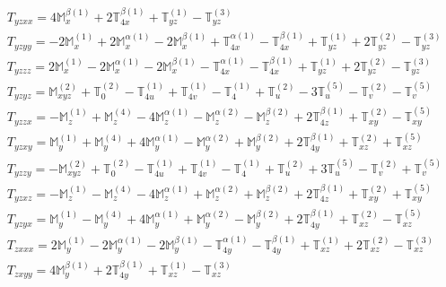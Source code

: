 \documentclass[fleqn,8pt,landscape]{jsarticle}
\begin{document}
\begin{align*}
& T_{yzxx} = 4 \mathbb{M}_{x}^{\beta(1)} + 2 \mathbb{T}_{4x}^{\beta(1)} + \mathbb{T}_{yz}^{(1)} - \mathbb{T}_{yz}^{(3)} \\
& T_{yzyy} = - 2 \mathbb{M}_{x}^{(1)} + 2 \mathbb{M}_{x}^{\alpha(1)} - 2 \mathbb{M}_{x}^{\beta(1)} + \mathbb{T}_{4x}^{\alpha(1)} - \mathbb{T}_{4x}^{\beta(1)} + \mathbb{T}_{yz}^{(1)} + 2 \mathbb{T}_{yz}^{(2)} - \mathbb{T}_{yz}^{(3)} \\
& T_{yzzz} = 2 \mathbb{M}_{x}^{(1)} - 2 \mathbb{M}_{x}^{\alpha(1)} - 2 \mathbb{M}_{x}^{\beta(1)} - \mathbb{T}_{4x}^{\alpha(1)} - \mathbb{T}_{4x}^{\beta(1)} + \mathbb{T}_{yz}^{(1)} + 2 \mathbb{T}_{yz}^{(2)} - \mathbb{T}_{yz}^{(3)} \\
& T_{yzyz} = \mathbb{M}_{xyz}^{(2)} + \mathbb{T}_{0}^{(2)} - \mathbb{T}_{4u}^{(1)} + \mathbb{T}_{4v}^{(1)} - \mathbb{T}_{4}^{(1)} + \mathbb{T}_{u}^{(2)} - 3 \mathbb{T}_{u}^{(5)} - \mathbb{T}_{v}^{(2)} - \mathbb{T}_{v}^{(5)} \\
& T_{yzzx} = - \mathbb{M}_{z}^{(1)} + \mathbb{M}_{z}^{(4)} - 4 \mathbb{M}_{z}^{\alpha(1)} - \mathbb{M}_{z}^{\alpha(2)} - \mathbb{M}_{z}^{\beta(2)} + 2 \mathbb{T}_{4z}^{\beta(1)} + \mathbb{T}_{xy}^{(2)} - \mathbb{T}_{xy}^{(5)} \\
& T_{yzxy} = \mathbb{M}_{y}^{(1)} + \mathbb{M}_{y}^{(4)} + 4 \mathbb{M}_{y}^{\alpha(1)} - \mathbb{M}_{y}^{\alpha(2)} + \mathbb{M}_{y}^{\beta(2)} + 2 \mathbb{T}_{4y}^{\beta(1)} + \mathbb{T}_{xz}^{(2)} + \mathbb{T}_{xz}^{(5)} \\
& T_{yzzy} = - \mathbb{M}_{xyz}^{(2)} + \mathbb{T}_{0}^{(2)} - \mathbb{T}_{4u}^{(1)} + \mathbb{T}_{4v}^{(1)} - \mathbb{T}_{4}^{(1)} + \mathbb{T}_{u}^{(2)} + 3 \mathbb{T}_{u}^{(5)} - \mathbb{T}_{v}^{(2)} + \mathbb{T}_{v}^{(5)} \\
& T_{yzxz} = - \mathbb{M}_{z}^{(1)} - \mathbb{M}_{z}^{(4)} - 4 \mathbb{M}_{z}^{\alpha(1)} + \mathbb{M}_{z}^{\alpha(2)} + \mathbb{M}_{z}^{\beta(2)} + 2 \mathbb{T}_{4z}^{\beta(1)} + \mathbb{T}_{xy}^{(2)} + \mathbb{T}_{xy}^{(5)} \\
& T_{yzyx} = \mathbb{M}_{y}^{(1)} - \mathbb{M}_{y}^{(4)} + 4 \mathbb{M}_{y}^{\alpha(1)} + \mathbb{M}_{y}^{\alpha(2)} - \mathbb{M}_{y}^{\beta(2)} + 2 \mathbb{T}_{4y}^{\beta(1)} + \mathbb{T}_{xz}^{(2)} - \mathbb{T}_{xz}^{(5)} \\
& T_{zxxx} = 2 \mathbb{M}_{y}^{(1)} - 2 \mathbb{M}_{y}^{\alpha(1)} - 2 \mathbb{M}_{y}^{\beta(1)} - \mathbb{T}_{4y}^{\alpha(1)} - \mathbb{T}_{4y}^{\beta(1)} + \mathbb{T}_{xz}^{(1)} + 2 \mathbb{T}_{xz}^{(2)} - \mathbb{T}_{xz}^{(3)} \\
& T_{zxyy} = 4 \mathbb{M}_{y}^{\beta(1)} + 2 \mathbb{T}_{4y}^{\beta(1)} + \mathbb{T}_{xz}^{(1)} - \mathbb{T}_{xz}^{(3)} \\

\end{align*}
\end{document}
